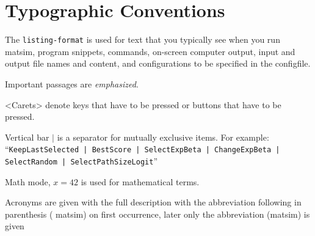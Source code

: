 \section*{Typographic Conventions}
\label{sec:typogr-conv}
The \lstinline|listing-format| is used for text that you typically see when you run \gls{matsim}, \ie program snippets, commands, on-screen computer output, input and output file names and content, and configurations to be specified in the \gls{configfile}.

Important passages are \emph{emphasized}. 

<Carets> denote keys that have to be pressed or buttons that have to be pressed.

Vertical bar $\lvert$ is a separator for mutually exclusive items. For example: ``\lstinline$KeepLastSelected | BestScore | SelectExpBeta | ChangeExpBeta | SelectRandom | SelectPathSizeLogit$''

Math mode, \eg $x=42$ is used for mathematical terms.

\glsresetall
Acronyms are given with the full description with the abbreviation following in parenthesis (\eg 
\gls{matsim}) on first occurrence, later only the abbreviation (\eg \gls{matsim}) is given



